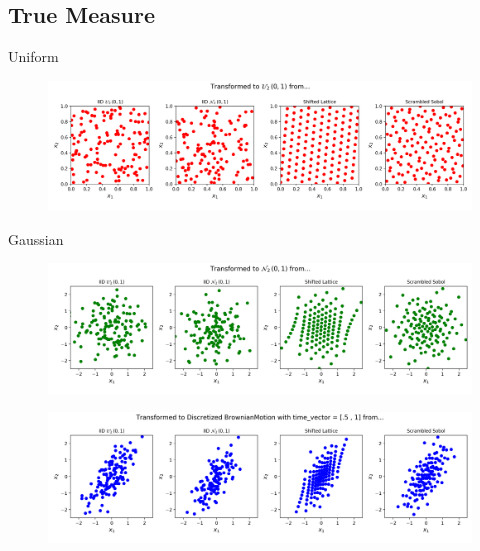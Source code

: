 \documentclass[11pt]{beamer}
\begin{document}
\subsection{True Measure}
\begin{frame}{Uniform}
    
    \begin{figure}[ht!]
        \centering
        \includegraphics[width=1\textwidth]
            {Figs/Uniform_tm_transform.png}
        \label{fig:u_tm}
    \end{figure}
\end{frame}
\begin{frame}{Gaussian}
    \begin{figure}[ht!]
        \centering
        \includegraphics[width=1\textwidth]
            {Figs/Gaussian_tm_transform.png}
        \label{fig:n_tm}
    \end{figure}
    \begin{figure}[ht!]
        \centering
        \includegraphics[width=1\textwidth]
            {Figs/BrownianMotion_tm_transform.png}
        \label{fig:bm_tm}
    \end{figure}
\end{frame}
\end{document}
